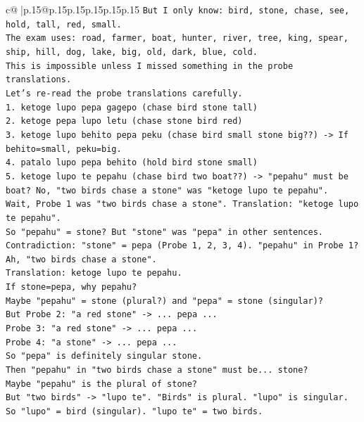 \documentclass{article}
\begin{document}
{\begin{supertabular}{c@{$\;$}|p{.15\linewidth}@{}p{.15\linewidth}p{.15\linewidth}p{.15\linewidth}p{.15\linewidth}p{.15\linewidth}}
{{{\texttt{But I only know: bird, stone, chase, see, hold, tall, red, small.} \\
\texttt{The exam uses: road, farmer, boat, hunter, river, tree, king, spear, ship, hill, dog, lake, big, old, dark, blue, cold.} \\
\texttt{This is impossible unless I missed something in the probe translations.} \\
\texttt{Let's re{-}read the probe translations carefully.} \\
\texttt{1. ketoge lupo pepa gagepo (chase bird stone tall)} \\
\texttt{2. ketoge pepa lupo letu (chase stone bird red)} \\
\texttt{3. ketoge lupo behito pepa peku (chase bird small stone big??) {-}> If behito=small, peku=big.} \\
\texttt{4. patalo lupo pepa behito (hold bird stone small)} \\
\texttt{5. ketoge lupo te pepahu (chase bird two boat??) {-}> "pepahu" must be boat? No, "two birds chase a stone" was "ketoge lupo te pepahu".} \\
\texttt{Wait, Probe 1 was "two birds chase a stone". Translation: "ketoge lupo te pepahu".} \\
\texttt{So "pepahu" = stone? But "stone" was "pepa" in other sentences.} \\
\texttt{Contradiction: "stone" = pepa (Probe 1, 2, 3, 4). "pepahu" in Probe 1?} \\
\texttt{Ah, "two birds chase a stone".} \\
\texttt{Translation: ketoge lupo te pepahu.} \\
\texttt{If stone=pepa, why pepahu?} \\
\texttt{Maybe "pepahu" = stone (plural?) and "pepa" = stone (singular)?} \\
\texttt{But Probe 2: "a red stone" {-}> ... pepa ...} \\
\texttt{Probe 3: "a red stone" {-}> ... pepa ...} \\
\texttt{Probe 4: "a stone" {-}> ... pepa ...} \\
\texttt{So "pepa" is definitely singular stone.} \\
\texttt{Then "pepahu" in "two birds chase a stone" must be... stone?} \\
\texttt{Maybe "pepahu" is the plural of stone?} \\
\texttt{But "two birds" {-}> "lupo te". "Birds" is plural. "lupo" is singular.} \\
\texttt{So "lupo" = bird (singular). "lupo te" = two birds.} \\
}}}
\end{supertabular}}
\end{document}
